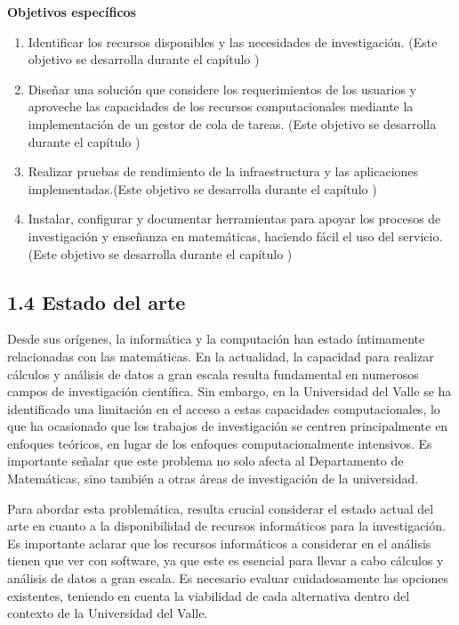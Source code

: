\begin{spacing}{1.5}
  \textbf{Objetivos específicos}
  \begin{enumerate}
    \item Identificar los recursos disponibles y las necesidades de investigación. (Este objetivo se desarrolla durante el capítulo )
    \item Diseñar una solución que considere los requerimientos de los usuarios y aproveche las capacidades de los recursos computacionales mediante la implementación de un gestor de cola de tareas. (Este objetivo se desarrolla durante el capítulo )
    \item  Realizar pruebas de rendimiento de la infraestructura y las aplicaciones implementadas.(Este objetivo se desarrolla durante el capítulo )
    \item Instalar, configurar y documentar herramientas para apoyar los procesos de investigación y enseñanza en matemáticas, haciendo fácil el uso del servicio.(Este objetivo se desarrolla durante el capítulo )\newline
  \end{enumerate}

  \subsection{1.4 Estado del arte}

  Desde sus orígenes, la informática y la computación han estado íntimamente relacionadas con las matemáticas. En la actualidad, la capacidad para realizar cálculos y análisis de datos a gran escala resulta fundamental en numerosos campos de investigación científica. Sin embargo, en la Universidad del Valle se ha identificado una limitación en el acceso a estas capacidades computacionales, lo que ha ocasionado que los trabajos de investigación se centren principalmente en enfoques teóricos, en lugar de los enfoques computacionalmente intensivos. Es importante señalar que este problema no solo afecta al Departamento de Matemáticas, sino también a otras áreas de investigación de la universidad.

  Para abordar esta problemática, resulta crucial considerar el estado actual del arte en cuanto a la disponibilidad de recursos informáticos para la investigación. Es importante aclarar que los recursos informáticos a considerar en el análisis tienen que ver con software, ya que este es esencial para llevar a cabo cálculos y análisis de datos a gran escala. Es necesario evaluar cuidadosamente las opciones existentes, teniendo en cuenta la viabilidad de cada alternativa dentro del contexto de la Universidad del Valle.


\end{spacing}
